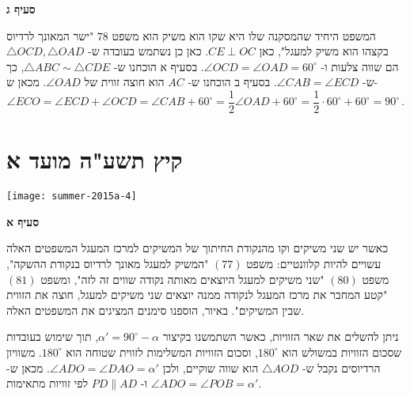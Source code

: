 \vspace{2ex}
\textbf{סעיף ג}

המשפט היחיד שהמסקנה שלו היא שקו הוא משיק הוא משפט
$78$
"ישר המאונך לרדיוס בקצהו הוא משיק למעגל", כאן
$CE\perp OC$.
כאן כן נשתמש בעובדה ש-%
$\triangle OCD,\triangle OAD$
הם שווה צלעות ו-%
$\angle OCD=\angle OAD=60^\circ$.
בסעיף א הוכחנו ש-%
$\triangle ABC\sim \triangle CDE$,
כך ש-%
$\angle CAB = \angle ECD$.
בסעיף ב הוכחנו ש-%
$AC$
הוא חוצה זווית של
$\angle OAD$.
מכאן ש-%
\[
\angle ECO = \angle ECD + \angle OCD = \angle CAB + 60^\circ = \frac{1}{2}\angle OAD + 60^\circ=\frac{1}{2}\cdot 60^\circ + 60^\circ = 90^\circ\,.
\]


\np


\section{קיץ תשע"ה מועד א}

\begin{center}
\texttt{[image: summer-2015a-4]}
\end{center}

\vspace{-2ex}
\textbf{סעיף א}


כאשר יש שני משיקים וקו מהנקודת החיתוך של המשיקים למרכז המעגל המשפטים האלה עשויים להיות קלוונטיים: משפט
$(77)$
"המשיק למעגל מאונך לרדיוס בנקודת ההשקה", משפט
$(80)$
"שני משיקים למעגל היוצאים מאותה נקודה שווים זה לזה", ומשפט
$(81)$
"קטע המחבר את מרכז המעגל לנקודה ממנה יוצאים שני משיקים למעגל, חוצה את הזווית שבין המשיקים". באיור, הוספנו סימנים המציגים את המשפטים האלה. 

ניתן להשלים את שאר הזוויות, כאשר השתמשנו בקיצור
$\alpha' = 90^\circ-\alpha$,
תוך שימוש בעובדות שסכום הזוויות במשולש הוא
$180^\circ$,
וסכום הזוויות המשלימות לזווית שטוחה הוא
$180^\circ$.
משוויון הרדיוסים נקבל ש-%
$\triangle AOD$
הוא שווה שוקיים, ולכן
$\angle ADO=\angle DAO=\alpha'$.
מכאן ש-%
$\angle ADO=\angle POB=\alpha'$
ו-%
$PD\|AD$
לפי זוויות מתאימות.

